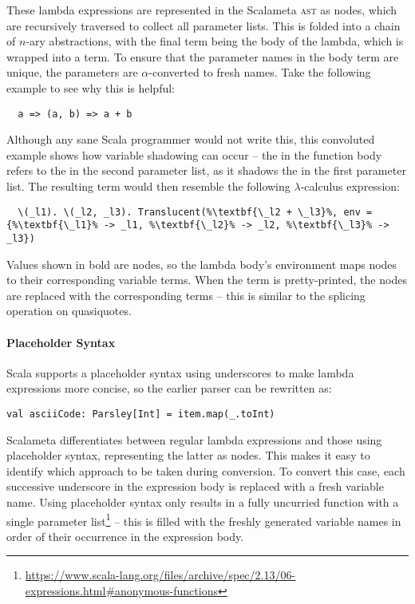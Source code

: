 \documentclass[../../../main.tex]{subfiles}
\begin{document}
These lambda expressions are represented in the Scalameta \textsc{ast} as  nodes, which are recursively traversed to collect all parameter lists.
This is folded into a chain of $n$-ary abstractions, with the final term being the body of the lambda, which is wrapped into a  term.
To ensure that the parameter names in the  body term are unique, the parameters are $\alpha$-converted to fresh names.
Take the following example to see why this is helpful:
\begin{verbatim}
  a => (a, b) => a + b
\end{verbatim}
Although any sane Scala programmer would not write this, this convoluted example shows how variable shadowing can occur -- the  in the function body refers to the  in the second parameter list, as it shadows the  in the first parameter list.
The resulting  term would then resemble the following $\lambda$-calculus expression:
\begin{lstlisting}
  \(_l1). \(_l2, _l3). Translucent(%\textbf{\_l2 + \_l3}%, env = {%\textbf{\_l1}% -> _l1, %\textbf{\_l2}% -> _l2, %\textbf{\_l3}% -> _l3})
\end{lstlisting}
Values shown in bold are  nodes, so the lambda body's environment maps  nodes to their corresponding variable terms.
When the term is pretty-printed, the  nodes are replaced with the corresponding  terms -- this is similar to the splicing operation on quasiquotes.

\paragraph{Placeholder Syntax}
Scala supports a placeholder syntax using underscores to make lambda expressions more concise, so the earlier parser can be rewritten as:
\begin{verbatim}
val asciiCode: Parsley[Int] = item.map(_.toInt)
\end{verbatim}

Scalameta differentiates between regular lambda expressions and those using placeholder syntax, representing the latter as  nodes.
This makes it easy to identify which approach to be taken during conversion.
To convert this case, each successive underscore in the expression body is replaced with a fresh variable name.
Using placeholder syntax only results in a fully uncurried function with a single parameter list\footnote{\url{https://www.scala-lang.org/files/archive/spec/2.13/06-expressions.html#anonymous-functions}} -- this is filled with the freshly generated variable names in order of their occurrence in the expression body.
\end{document}
